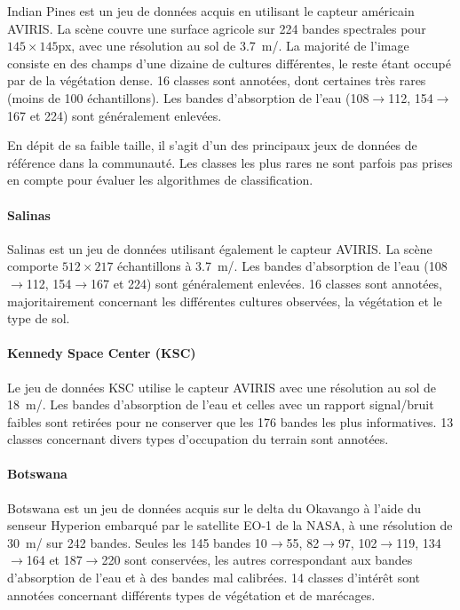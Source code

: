 Indian Pines est un jeu de données acquis en utilisant le capteur américain \gls{AVIRIS}. La scène couvre une surface agricole sur 224 bandes spectrales pour $145\times145$px, avec une résolution au sol de \SI{3,7}{\meter/\px}. La majorité de l'image consiste en des champs d'une dizaine de cultures différentes, le reste étant occupé par de la végétation dense. 16 classes sont annotées, dont certaines très rares (moins de 100 échantillons). Les bandes d'absorption de l'eau (108$\rightarrow$112, 154$\rightarrow$167 et 224) sont généralement enlevées.

En dépit de sa faible taille, il s'agit d'un des principaux jeux de données de référence dans la communauté. Les classes les plus rares ne sont parfois pas prises en compte pour évaluer les algorithmes de classification.

\paragraph{Salinas}
Salinas est un jeu de données utilisant également le capteur \gls{AVIRIS}. La scène comporte $512\times217$ échantillons à \SI{3,7}{\meter/\px}. Les bandes d'absorption de l'eau (108$\rightarrow$112, 154$\rightarrow$167 et 224) sont généralement enlevées. 16 classes sont annotées, majoritairement concernant les différentes cultures observées, la végétation et le type de sol.

\paragraph{Kennedy Space Center (KSC)}
Le jeu de données KSC utilise le capteur \gls{AVIRIS} avec une résolution au sol de \SI{18}{\meter/\px}. Les bandes d'absorption de l'eau et celles avec un rapport signal/bruit faibles sont retirées pour ne conserver que les 176 bandes les plus informatives. 13 classes concernant divers types d'occupation du terrain sont annotées.

\paragraph{Botswana}
Botswana est un jeu de données acquis sur le delta du Okavango à l'aide du senseur Hyperion embarqué par le satellite EO-1 de la NASA, à une résolution de \SI{30}{\meter/\px} sur 242 bandes. Seules les 145 bandes 10$\rightarrow$55, 82$\rightarrow$97, 102$\rightarrow$119, 134$\rightarrow$164 et 187$\rightarrow$220 sont conservées, les autres correspondant aux bandes d'absorption de l'eau et à des bandes mal calibrées. 14 classes d'intérêt sont annotées concernant différents types de végétation et de marécages.

